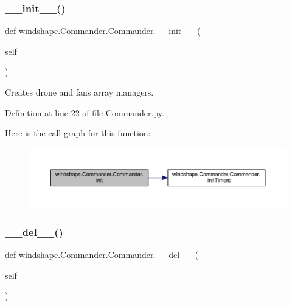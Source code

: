 \subsubsection{\texorpdfstring{\+\_\+\+\_\+init\+\_\+\+\_\+()}{\_\_init\_\_()}}
{\footnotesize\ttfamily def windshape.\+Commander.\+Commander.\+\_\+\+\_\+init\+\_\+\+\_\+ (\begin{DoxyParamCaption}\item[{}]{self }\end{DoxyParamCaption})}

\begin{DoxyVerb}Creates drone and fans array managers.\end{DoxyVerb}
 

Definition at line 22 of file Commander.\+py.

Here is the call graph for this function\+:\nopagebreak
\begin{figure}[H]
\begin{center}
\leavevmode
\includegraphics[width=350pt]{classwindshape_1_1_commander_1_1_commander_ac3981f08b87030cbda690d7100e5c35c_cgraph}
\end{center}
\end{figure}
\mbox{\label{classwindshape_1_1_commander_1_1_commander_acc11cb334a91d601f066f8f560bdb168}} 
\subsubsection{\texorpdfstring{\+\_\+\+\_\+del\+\_\+\+\_\+()}{\_\_del\_\_()}}
{\footnotesize\ttfamily def windshape.\+Commander.\+Commander.\+\_\+\+\_\+del\+\_\+\+\_\+ (\begin{DoxyParamCaption}\item[{}]{self }\end{DoxyParamCaption})}

